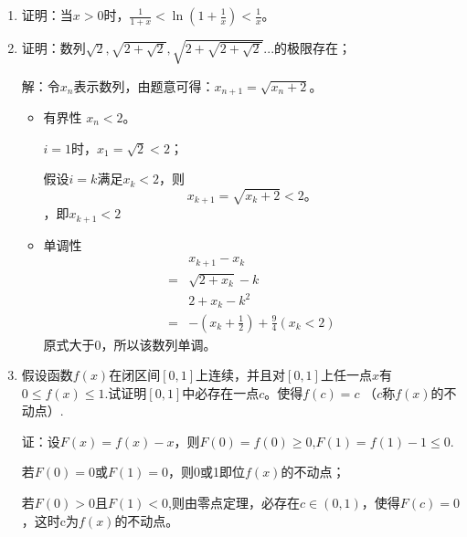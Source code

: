 \documentclass[UTF8]{ctexart}
\begin{document}
\begin{enumerate}
			\item 证明：当$x>0$时，$\frac{1}{1+x}<\ln(1+\frac{1}{x})<\frac{1}{x}$。
			
			\item 证明：数列$\sqrt2,\sqrt{2+\sqrt{2}},\sqrt{2+\sqrt{2+\sqrt{2}}}...$的极限存在；
			
			解：令$x_n$表示数列，由题意可得：$x_{n+1}=\sqrt{x_n+2}$。
			
			\begin{itemize}
				\item 有界性 $x_n<2$。
				
				$i=1$时，$x_1=\sqrt{2}<2$；
				
				假设$i=k$满足$x_k<2$，则
				$$
				x_{k+1}=\sqrt{x_{k}+2}<2。
				$$，即$x_{k+1}<2$
				
				\item 单调性 
				\begin{equation}
					\begin{split}
						 &x_{k+1}-x_k \\
						=&\sqrt{2+x_k}-k\\
						&2+x_k-k^2\\
						=&-(x_k+\frac{1}{2})+\frac{9}{4}(x_k<2)
					\end{split}
				\end{equation}
				原式大于$0$，所以该数列单调。
			\end{itemize}
			
			\item 假设函数$f(x)$在闭区间$[0,1]$上连续，并且对$[0,1]$上任一点$x$有
			$0\leq f(x)\leq 1$.试证明$[0,1]$中必存在一点$c$。使得$f(c)=c$
			（$c$称$f(x)$的不动点）.
			
			证：设$F(x)=f(x)-x$，则$F(0)=f(0)\geq 0$,$F(1)=f(1)-1\leq 0.$
			
			若$F(0)=0$或$F(1)=0$，则0或1即位$f(x)$的不动点；
			
			若$F(0)>0$且$F(1)<0$,则由零点定理，必存在$c\in(0,1)$，使得$F(c)=0$，这时c为$f(x)$的不动点。
			\end{enumerate}
\end{document}
